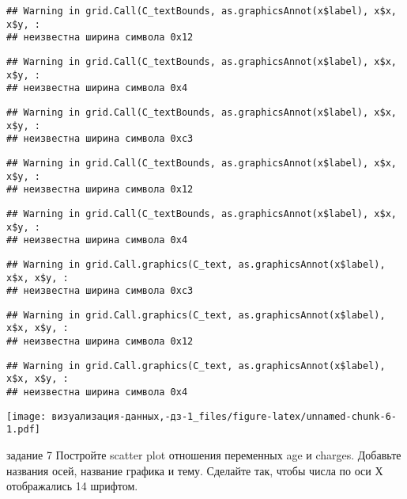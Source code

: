 \documentclass[
]{article}
\begin{document}
\begin{verbatim}
## Warning in grid.Call(C_textBounds, as.graphicsAnnot(x$label), x$x, x$y, :
## неизвестна ширина символа 0x12
\end{verbatim}

\begin{verbatim}
## Warning in grid.Call(C_textBounds, as.graphicsAnnot(x$label), x$x, x$y, :
## неизвестна ширина символа 0x4
\end{verbatim}

\begin{verbatim}
## Warning in grid.Call(C_textBounds, as.graphicsAnnot(x$label), x$x, x$y, :
## неизвестна ширина символа 0xc3
\end{verbatim}

\begin{verbatim}
## Warning in grid.Call(C_textBounds, as.graphicsAnnot(x$label), x$x, x$y, :
## неизвестна ширина символа 0x12
\end{verbatim}

\begin{verbatim}
## Warning in grid.Call(C_textBounds, as.graphicsAnnot(x$label), x$x, x$y, :
## неизвестна ширина символа 0x4
\end{verbatim}

\begin{verbatim}
## Warning in grid.Call.graphics(C_text, as.graphicsAnnot(x$label), x$x, x$y, :
## неизвестна ширина символа 0xc3
\end{verbatim}

\begin{verbatim}
## Warning in grid.Call.graphics(C_text, as.graphicsAnnot(x$label), x$x, x$y, :
## неизвестна ширина символа 0x12
\end{verbatim}

\begin{verbatim}
## Warning in grid.Call.graphics(C_text, as.graphicsAnnot(x$label), x$x, x$y, :
## неизвестна ширина символа 0x4
\end{verbatim}

\texttt{[image: визуализация-данных,-дз-1\_files/figure-latex/unnamed-chunk-6-1.pdf]}

задание 7 Постройте scatter plot отношения переменных age и charges.
Добавьте названия осей, название графика и тему. Сделайте так, чтобы
числа по оси Х отображались 14 шрифтом.
\end{document}
